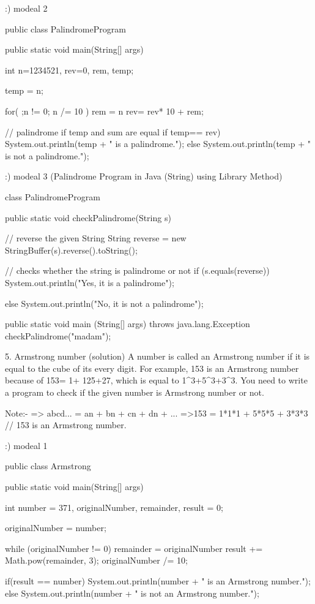 		:) modeal 2
		
		public class PalindromeProgram {
  
    public static void main(String[] args) {
  
        int n=1234521, rev=0, rem, temp;
  
        temp = n;
  
        for( ;n != 0; n /= 10 )
        {
            rem = n %
            rev= rev* 10 + rem;
        }
  
        // palindrome if temp and sum are equal
        if temp== rev)
            System.out.println(temp + " is a palindrome.");
        else
            System.out.println(temp + " is not a palindrome.");
    }
}


		:) modeal 3 (Palindrome Program in Java (String) using Library Method)
		
		class PalindromeProgram
{
public static void checkPalindrome(String s)
{
// reverse the given String
String reverse = new StringBuffer(s).reverse().toString();
 
// checks whether the string is palindrome or not
if (s.equals(reverse))
System.out.println("Yes, it is a palindrome");
 
else
System.out.println("No, it is not a palindrome");
}
 
public static void main (String[] args)
throws java.lang.Exception
{
checkPalindrome("madam");
}
}



5. Armstrong number (solution)
A number is called an Armstrong number if it is equal to the cube of its every digit. 
For example, 153 is an Armstrong number because of 153= 1+ 125+27, which is equal to 1^3+5^3+3^3. 
You need to write a program to check if the given number is Armstrong number or not.

Note:-  => abcd... = an + bn + cn + dn + ...
		=>153 = 1*1*1 + 5*5*5 + 3*3*3  // 153 is an Armstrong number.
		
		:) modeal 1
		
		public class Armstrong {

    public static void main(String[] args) {

        int number = 371, originalNumber, remainder, result = 0;

        originalNumber = number;

        while (originalNumber != 0)
        {
            remainder = originalNumber %
            result += Math.pow(remainder, 3);
            originalNumber /= 10;
        }

        if(result == number)
            System.out.println(number + " is an Armstrong number.");
        else
            System.out.println(number + " is not an Armstrong number.");
    }
}

